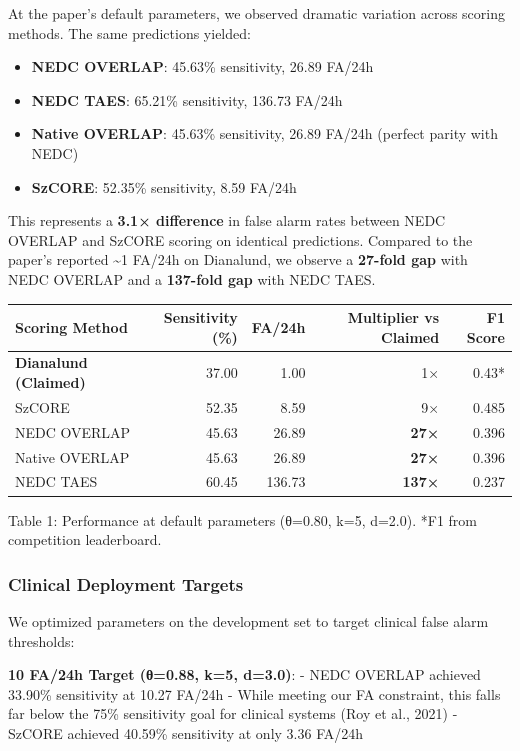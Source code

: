\documentclass[
  10pt,
]{article}
\providecommand{\tightlist}{%
  \setlength{\itemsep}{0pt}\setlength{\parskip}{0pt}}
\begin{document}
At the paper's default parameters, we observed dramatic variation across
scoring methods. The same predictions yielded:

\begin{itemize}
\tightlist
\item
  \textbf{NEDC OVERLAP}: 45.63\% sensitivity, 26.89 FA/24h
\item
  \textbf{NEDC TAES}: 65.21\% sensitivity, 136.73 FA/24h
\item
  \textbf{Native OVERLAP}: 45.63\% sensitivity, 26.89 FA/24h (perfect
  parity with NEDC)
\item
  \textbf{SzCORE}: 52.35\% sensitivity, 8.59 FA/24h
\end{itemize}

This represents a \textbf{3.1× difference} in false alarm rates between
NEDC OVERLAP and SzCORE scoring on identical predictions. Compared to
the paper's reported \textasciitilde1 FA/24h on Dianalund, we observe a
\textbf{27-fold gap} with NEDC OVERLAP and a \textbf{137-fold gap} with
NEDC TAES.

\begin{longtable}[]{@{}lrrrr@{}}
\toprule
Scoring Method & Sensitivity (\%) & FA/24h & Multiplier vs Claimed & F1
Score\tabularnewline
\midrule
\endhead
\textbf{Dianalund (Claimed)} & 37.00 & 1.00 & 1× & 0.43*\tabularnewline
SzCORE & 52.35 & 8.59 & 9× & 0.485\tabularnewline
NEDC OVERLAP & 45.63 & 26.89 & \textbf{27×} & 0.396\tabularnewline
Native OVERLAP & 45.63 & 26.89 & \textbf{27×} & 0.396\tabularnewline
NEDC TAES & 60.45 & 136.73 & \textbf{137×} & 0.237\tabularnewline
\bottomrule
\end{longtable}

Table 1: Performance at default parameters (θ=0.80, k=5, d=2.0). *F1
from competition leaderboard.

\hypertarget{clinical-deployment-targets}{%
\subsubsection{Clinical Deployment
Targets}\label{clinical-deployment-targets}}

We optimized parameters on the development set to target clinical false
alarm thresholds:

\textbf{10 FA/24h Target (θ=0.88, k=5, d=3.0)}: - NEDC OVERLAP achieved
33.90\% sensitivity at 10.27 FA/24h - While meeting our FA constraint,
this falls far below the 75\% sensitivity goal for clinical systems (Roy
et al., 2021) - SzCORE achieved 40.59\% sensitivity at only 3.36 FA/24h
\end{document}
